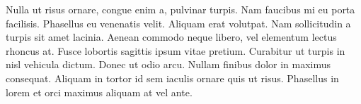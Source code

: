 \documentclass{book}
\begin{document}
Nulla ut risus ornare, congue enim a, pulvinar turpis. Nam faucibus mi eu porta facilisis. Phasellus eu venenatis velit. Aliquam erat volutpat. Nam sollicitudin a turpis sit amet lacinia. Aenean commodo neque libero, vel elementum lectus rhoncus at. Fusce lobortis sagittis ipsum vitae pretium. Curabitur ut turpis in nisl vehicula dictum. Donec ut odio arcu. Nullam finibus dolor in maximus consequat. Aliquam in tortor id sem iaculis ornare quis ut risus. Phasellus in lorem et orci maximus aliquam at vel ante.
\end{document}
